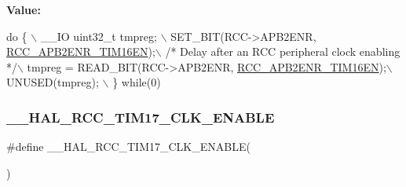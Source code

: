 {\bfseries Value\+:}
\begin{DoxyCode}
\textcolor{keywordflow}{do} \{ \(\backslash\)
                                        \_\_IO uint32\_t tmpreg; \(\backslash\)
                                        SET\_BIT(RCC->APB2ENR, 
      \hyperlink{group___peripheral___registers___bits___definition_gaece1d96f631bcf146e5998314fd90910}{RCC\_APB2ENR\_TIM16EN});\(\backslash\)
                                        \textcolor{comment}{/* Delay after an RCC peripheral clock enabling */}\(\backslash\)
                                        tmpreg = READ\_BIT(RCC->APB2ENR, 
      \hyperlink{group___peripheral___registers___bits___definition_gaece1d96f631bcf146e5998314fd90910}{RCC\_APB2ENR\_TIM16EN});\(\backslash\)
                                        UNUSED(tmpreg); \(\backslash\)
                                      \} \textcolor{keywordflow}{while}(0)
\end{DoxyCode}
\mbox{\label{group___r_c_c___a_p_b2___clock___enable___disable_ga983ec0b6719bbf98e40818a8e6817c58}} 
\subsubsection{\texorpdfstring{\+\_\+\+\_\+\+H\+A\+L\+\_\+\+R\+C\+C\+\_\+\+T\+I\+M17\+\_\+\+C\+L\+K\+\_\+\+E\+N\+A\+B\+LE}{\_\_HAL\_RCC\_TIM17\_CLK\_ENABLE}}
{\footnotesize\ttfamily \#define \+\_\+\+\_\+\+H\+A\+L\+\_\+\+R\+C\+C\+\_\+\+T\+I\+M17\+\_\+\+C\+L\+K\+\_\+\+E\+N\+A\+B\+LE(\begin{DoxyParamCaption}{ }\end{DoxyParamCaption})}

